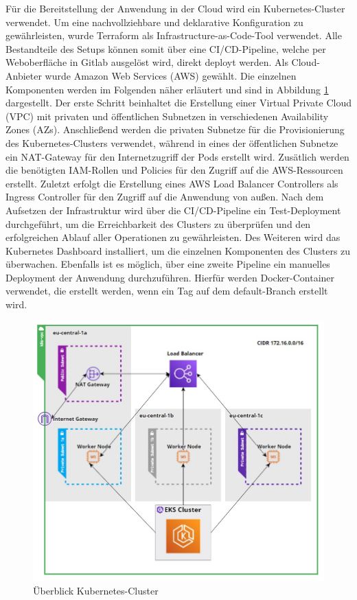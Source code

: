 \documentclass[a4paper, 10pt, conference]{IEEEtran}
\begin{document}
Für die Bereitstellung der Anwendung in der Cloud wird ein Kubernetes-Cluster \cite{k8s} verwendet. 
Um eine nachvollziehbare und deklarative Konfiguration zu gewährleisten, wurde Terraform \cite{terraform} als Infrastructure-as-Code-Tool verwendet. 
Alle Bestandteile des Setups können somit über eine CI/CD-Pipeline, welche per Weboberfläche in Gitlab ausgelöst wird, direkt deployt werden.
Als Cloud-Anbieter wurde Amazon Web Services (AWS) \cite{aws} gewählt. Die einzelnen Komponenten werden im Folgenden näher erläutert und sind in Abbildung \ref{fig:infra} dargestellt.
Der erste Schritt beinhaltet die Erstellung einer Virtual Private Cloud (VPC) mit privaten und öffentlichen Subnetzen in verschiedenen Availability Zones (AZs).
Anschließend werden die privaten Subnetze für die Provisionierung des Kubernetes-Clusters verwendet, während in eines der öffentlichen Subnetze ein NAT-Gateway für den Internetzugriff der Pods erstellt wird.
Zusätlich werden die benötigten IAM-Rollen und Policies für den Zugriff auf die AWS-Ressourcen erstellt.
Zuletzt erfolgt die Erstellung eines AWS Load Balancer Controllers als Ingress Controller für den Zugriff auf die Anwendung von außen.
Nach dem Aufsetzen der Infrastruktur wird über die CI/CD-Pipeline ein Test-Deployment durchgeführt, um die Erreichbarkeit des Clusters zu überprüfen und den erfolgreichen Ablauf aller Operationen zu gewährleisten.
Des Weiteren wird das Kubernetes Dashboard installiert, um die einzelnen Komponenten des Clusters zu überwachen.
Ebenfalls ist es möglich, über eine zweite Pipeline ein manuelles Deployment der Anwendung durchzuführen.
Hierfür werden Docker-Container verwendet, die erstellt werden, wenn ein Tag auf dem default-Branch erstellt wird.

\begin{figure}[thp]
    \centering
    \includegraphics[width=\linewidth]{k8s}
    \caption{Überblick Kubernetes-Cluster}
    \label{fig:infra}
\end{figure}
\end{document}
